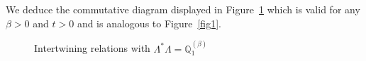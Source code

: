 \documentclass[AHL,Unicode,longabstracts]{cedram}
\newcommand{\fm}{\mathfrak{m}}
\newcommand{\dBs}{{\discret{Q}}}
\newcommand{\Bs}{Q}
\newcommand{\esL}{\mathbf{L}}
\newcommand{\esLd}{\ell}
\newcommand{\discret}[1]{\mathds{#1}}
\newcommand{\adjL}{\Lambda^*}
\begin{document}
We deduce the commutative diagram displayed in Figure~\ref{fig2} which is valid for any $\beta>0$ and $t>0$ and is analogous to Figure~\ref{fig1}.

\begin{figure}[ht]\centering
{}
\caption{Intertwining relations with $\adjL \Lambda=\dBs^{(\beta)}_1$}\label{fig2}
\end{figure}
\end{document}
